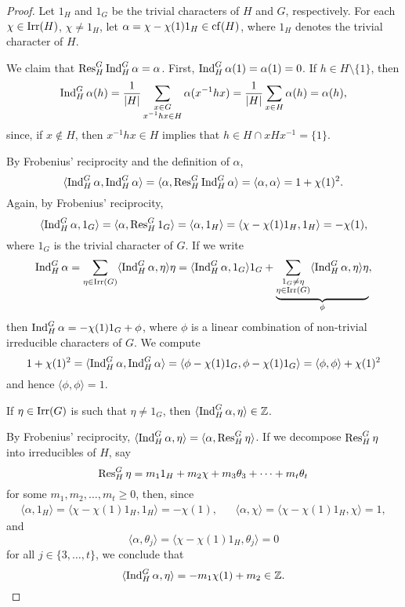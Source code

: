 \begin{proof}
    Let $1_H$ and $1_G$ be the trivial characters of $H$ and $G$, respectively.  
  For each $\chi\in\operatorname{Irr}(H)$, $\chi\ne1_H$, let 
  $\alpha=\chi-\chi(1)1_H\in\operatorname{cf}(H)$, where $1_H$ denotes the trivial character of $H$. 

  We claim that $\operatorname{Res}_H^G\operatorname{Ind}_H^G\alpha=\alpha$.
  First, $\operatorname{Ind}_H^G\alpha(1)=\alpha(1)=0$. If $h\in H\setminus\{1\}$, then 
  \[
    \operatorname{Ind}_H^G\alpha(h)=\frac{1}{|H|}\sum_{\substack{x\in G\\x^{-1}hx\in H}}\alpha(x^{-1}hx)
    =\frac{1}{|H|}\sum_{x\in H}\alpha(h)=\alpha(h),
  \]
  since, if $x\not\in H$, then $x^{-1}hx\in H$ implies that 
  $h\in H\cap xHx^{-1}=\{1\}$.

  By Frobenius' reciprocity and the definition of $\alpha$, 
  \begin{equation}
    \label{eq:<a,a>=1+chi2}
    \langle\operatorname{Ind}_H^G\alpha,\operatorname{Ind}_H^G\alpha\rangle
    =\langle\alpha,\operatorname{Res}_H^G\operatorname{Ind}_H^G\alpha\rangle=\langle\alpha,\alpha\rangle
    =1+\chi(1)^2.
  \end{equation}
  Again, by Frobenius' reciprocity, 
  \[
  \langle\operatorname{Ind}_H^G\alpha,1_G\rangle
  =\langle\alpha,\operatorname{Res}_H^G1_G\rangle
  =\langle\alpha,1_H\rangle
  =\langle\chi-\chi(1)1_H,1_H\rangle
  =-\chi(1),
  \]
  where $1_G$ is the trivial character of $G$. If we write 
  \[
  \operatorname{Ind}_H^G\alpha=\sum_{\eta\in\operatorname{Irr}(G)}\langle\operatorname{Ind}_H^G\alpha,\eta\rangle\eta
  =\langle\operatorname{Ind}_H^G\alpha,1_G\rangle1_G+\underbrace{\sum_{\substack{1_G\ne\eta\\\eta\in\operatorname{Irr}(G)}}\langle\operatorname{Ind}_H^G\alpha,\eta\rangle\eta}_{\phi},
  \]
  then $\operatorname{Ind}_H^G\alpha=-\chi(1)1_G+\phi$, where $\phi$ is a linear combination of non-trivial 
  irreducible characters of $G$. We compute 
  \[
  1+\chi(1)^2=\langle\operatorname{Ind}_H^G\alpha,\operatorname{Ind}_H^G\alpha\rangle
  =\langle\phi-\chi(1)1_G,\phi-\chi(1)1_G\rangle
  =\langle\phi,\phi\rangle+\chi(1)^2
  \]
  and hence $\langle\phi,\phi\rangle=1$. 
  
  \begin{claim}
  If $\eta\in\operatorname{Irr}(G)$ is such that $\eta\ne 1_G$, then 
  $\langle\operatorname{Ind}_H^G\alpha,\eta\rangle\in\mathbb{Z}$. 
  \end{claim}
  
  By Frobenius' reciprocity, $\langle\operatorname{Ind}_H^G\alpha,\eta\rangle=\langle\alpha,\operatorname{Res}_H^G\eta\rangle$. 
  If we decompose $\operatorname{Res}_H^G\eta$ into irreducibles of $H$, say 
  \[
  \operatorname{Res}_H^G\eta=m_11_H+m_2\chi+m_3\theta_3+\cdots+m_t\theta_t
  \]
  for some $m_1,m_2,\dots,m_t\geq0$, 
  then, since 
  \begin{align*}
  \langle\alpha,1_H\rangle=\langle\chi-\chi(1)1_H,1_H\rangle=-\chi(1),
  &&\langle\alpha,\chi\rangle=\langle\chi-\chi(1)1_H,\chi\rangle=1,
  \end{align*}
  and 
  \[
  \langle\alpha,\theta_j\rangle=\langle\chi-\chi(1)1_H,\theta_j\rangle=0
  \]
  for all $j\in\{3,\dots,t\}$, we conclude that 
  \[
  \langle\operatorname{Ind}_H^G\alpha,\eta\rangle=-m_1\chi(1)+m_2\in\mathbb{Z}.
  \]
  

\end{proof}
